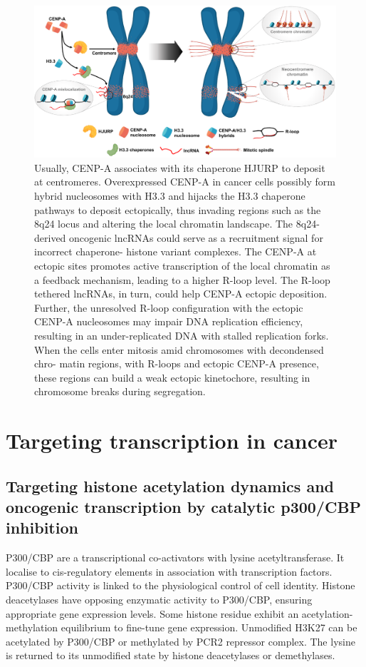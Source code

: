 \begin{figure}
\centering
\includegraphics[width=\textwidth]{../_resources/cenp.png}
\caption{Usually, CENP-A associates with its chaperone HJURP to deposit at centromeres. Overexpressed CENP-A in cancer cells possibly form hybrid nucleosomes with H3.3 and hijacks the H3.3 chaperone pathways to deposit ectopically, thus invading regions such as the 8q24 locus and altering the local chromatin landscape. The 8q24-derived oncogenic lncRNAs could serve as a recruitment signal for incorrect chaperone- histone variant complexes. The CENP-A at ectopic sites promotes active transcription of the local chromatin as a feedback mechanism, leading to a higher R-loop level. The R-loop tethered lncRNAs, in turn, could help CENP-A ectopic deposition. Further, the unresolved R-loop configuration with the ectopic CENP-A nucleosomes may impair DNA replication efficiency, resulting in an under-replicated DNA with stalled replication forks. When the cells enter mitosis amid chromosomes with decondensed chro- matin regions, with R-loops and ectopic CENP-A presence, these regions can build a weak ectopic kinetochore, resulting in chromosome breaks during segregation.}
\end{figure}

\section{Targeting transcription in cancer}
\subsection{Targeting histone acetylation dynamics and oncogenic transcription by catalytic p300/CBP inhibition}
P300/CBP are a transcriptional co-activators with lysine acetyltransferase. It localise to cis-regulatory elements in association with transcription factors. P300/CBP activity is linked to the physiological control of cell identity. Histone deacetylases have opposing enzymatic activity to P300/CBP, ensuring appropriate gene expression levels.
Some histone residue exhibit an acetylation-methylation equilibrium to fine-tune gene expression.
Unmodified H3K27  can be acetylated by P300/CBP or methylated by PCR2 repressor complex. The lysine is returned to its unmodified state by histone deacetylases or demethylases.

